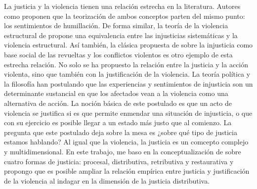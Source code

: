 \documentclass[12pt,twoside]{templates/facsothesis}
\begin{document}
La justicia y la violencia tienen una relación estrecha en la literatura. Autores como \citet{Bufacchi2007} proponen que la teorización de ambos conceptos parten del mismo punto: los sentimientos de humillación. De forma similar, la teoría de la violencia estructural de \citet{Galtung1968} propone una equivalencia entre las injusticias sistemáticas y la violencia estructural. Así también, la clásica propuesta de \citet{BarringtonMoore1978} sobre la injusticia como base social de las revueltas y los conflictos violentos es otro ejemplo de esta estrecha relación. No solo se ha propuesto la relación entre la justicia y la acción violenta, sino que también con la justificación de la violencia. La teoría política y la filosofía han postulando que las experiencias y sentimientos de injusticia son un determinante sustancial en que los afectados vean a la violencia como una alternativa de acción\citep[e.g][]{Wells1970, Bufacchi2007}. La noción básica de este postulado es que un acto de violencia se justifica si es que permite enmendar una situación de injusticia, o que con su ejercicio es posible llegar a un estado más justo que al comienzo. La pregunta que este postulado deja sobre la mesa es ¿sobre qué tipo de justicia estamos hablando? Al igual que la violencia, la justicia es un comcepto complejo y multidimensional. En este trabajo, me baso en la conceptualización de \citet{Sabbagh2016} sobre cuatro formas de justicia: procesal, distributiva, retributiva y restaurativa y propongo que es posible ampliar la relación empírica entre justicia y justificación de la violencia al indagar en la dimensión de la justicia distributiva.
\end{document}

